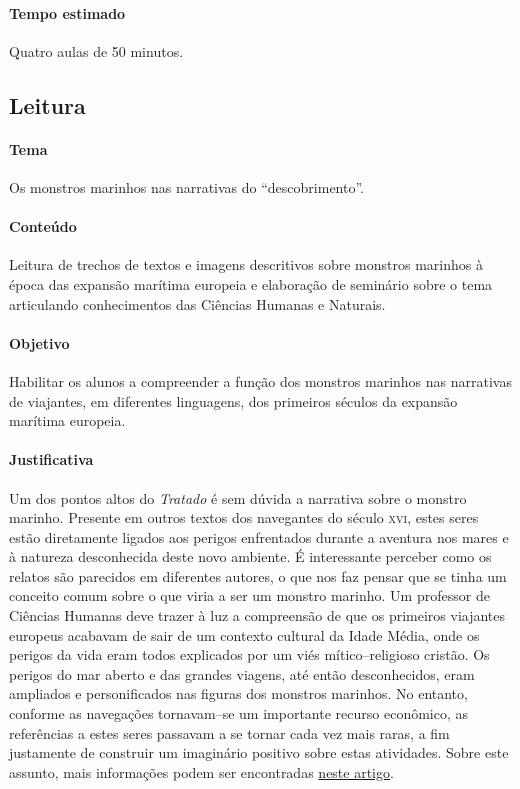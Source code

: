 \documentclass[12pt]{extarticle}
\begin{document}
{\paragraph{Tempo estimado} Quatro aulas de 50 minutos.


\subsection{Leitura}

\paragraph{Tema} Os monstros marinhos nas narrativas do ``descobrimento''.

\paragraph{Conteúdo} Leitura de trechos de textos e imagens descritivos
sobre monstros marinhos à época das expansão marítima europeia e 
elaboração de seminário sobre o tema articulando conhecimentos das 
Ciências Humanas e Naturais.  

\paragraph{Objetivo} Habilitar os alunos a compreender a função dos 
monstros marinhos nas narrativas de viajantes, em diferentes linguagens, 
dos primeiros séculos da expansão marítima europeia.

\paragraph{Justificativa} Um dos pontos altos do \emph{Tratado} é sem
dúvida a narrativa sobre o monstro marinho. Presente em outros textos 
dos navegantes do século \textsc{xvi}, estes seres estão diretamente
ligados aos perigos enfrentados durante a aventura nos mares e à natureza
desconhecida deste novo ambiente. É interessante perceber como os relatos
são parecidos em diferentes autores, o que nos faz pensar que se tinha 
um conceito comum sobre o que viria a ser um monstro marinho. 
Um professor de Ciências Humanas deve trazer à luz a compreensão de que
os primeiros viajantes europeus acabavam de sair de um contexto cultural
da Idade Média, onde os perigos da vida eram todos explicados por um
viés mítico--religioso cristão. Os perigos do mar aberto e das grandes 
viagens, até então desconhecidos, eram ampliados e personificados nas
figuras dos monstros marinhos. No entanto, conforme as navegações 
tornavam--se um importante recurso econômico, as referências a estes seres
passavam a se tornar cada vez mais raras, a fim justamente de construir
um imaginário positivo sobre estas atividades. 
Sobre este assunto, mais informações podem ser encontradas \href{https://www2.ufjf.br/noticias/2015/12/16/monstros-na-historia-relatos-de-viagens-expedicionarias-e-brasil-colonia/}{neste artigo}.

}
\end{document}
